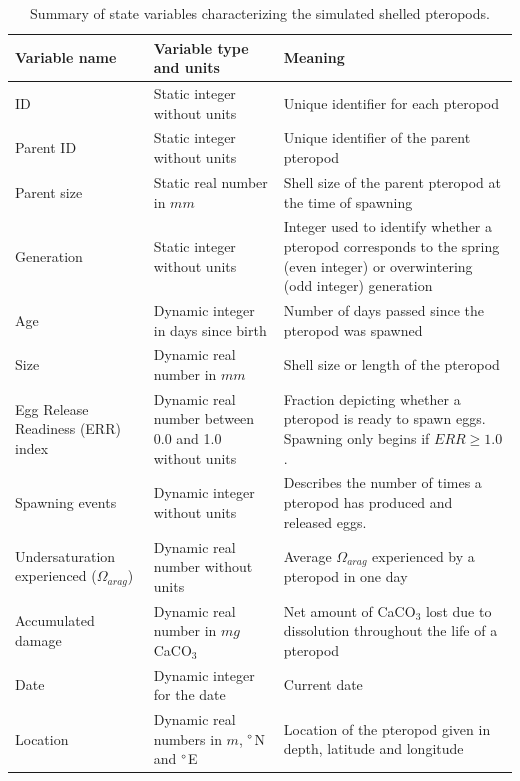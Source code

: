 \begin{table}[h!]
    
    \caption{Summary of state variables characterizing the simulated shelled pteropods.}
    \label{tab:state_variables_pteropods}
    \centering
    \scriptsize
    \begin{tabulary}{0.9\textwidth}{LLL}
    
    
        \hline
        \textbf{Variable name}                & \textbf{Variable type and units}                       & \textbf{Meaning}                                             \\ \hline
        ID                                    & Static integer without units                           & Unique identifier for each pteropod                          \\ \hline
        Parent ID                             & Static integer without units                           & Unique identifier of the parent pteropod                     \\ \hline
        Parent size                           & Static real number in $mm$                      & Shell size of the parent pteropod at the time of spawning    \\ \hline
        Generation          & Static integer without units      & Integer used to identify whether a pteropod corresponds to the spring (even integer) or overwintering (odd integer) generation \\ \hline
        Age                      & Dynamic integer in days since birth                         & Number of days passed since the pteropod was spawned         \\ \hline
        Size                                  & Dynamic real number in $mm$                     & Shell size or length of the pteropod                         \\ \hline
        
        Egg Release Readiness (ERR) index           & Dynamic real number between 0.0 and 1.0 without units  & Fraction depicting whether a pteropod is ready to spawn eggs. Spawning only begins if $ERR \geq 1.0$.  \\ \hline
        Spawning events & Dynamic integer without units & Describes the number of times a pteropod has produced and released eggs. \\ \hline
        Undersaturation experienced ($\Omega_{arag}$)   & Dynamic real number without units & Average $\Omega_{arag}$ experienced by a pteropod in one day \\ \hline
        Accumulated damage & Dynamic real number in $mg$ CaCO$_3$ & Net amount of CaCO$_3$ lost due to dissolution throughout the life of a pteropod \\ \hline
        Date      & Dynamic integer for the date & Current date          \\ \hline
        Location    & Dynamic real numbers in $m$, $\degree$N and $\degree$E & Location of the pteropod given in depth, latitude and longitude \\ \hline
    \end{tabulary}
\end{table}



